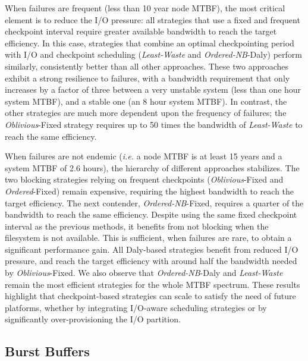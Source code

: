 \documentclass[two]{article}
\newcommand{\ie}[0]{\emph{i.e.}\xspace}
\newcommand{\nocoop}{\emph{Oblivious}\xspace}
\newcommand{\fifoblock}{\emph{Ordered}\xspace}
\newcommand{\fifononblock}{\emph{Ordered-NB}\xspace}
\newcommand{\leastwaste}{\emph{Least-Waste}\xspace}
\def\propfixed{\nocoop-Fixed\xspace}
\def\bfifofixed{\fifoblock-Fixed\xspace}
\def\fifofixed{\fifononblock-Fixed\xspace}
\def\fifodaly{\fifononblock-Daly\xspace}
\def\cooperative{\leastwaste}
\begin{document}
When failures are frequent (less than 10 year node MTBF), the most critical
element is to reduce the I/O pressure: all strategies that use a fixed and
frequent checkpoint interval require greater available bandwidth to reach the
target efficiency.  In this case, strategies that combine an optimal
checkpointing period with I/O and checkpoint scheduling (\cooperative and
\fifodaly) perform similarly, consistently better than all other approaches.
These two approaches exhibit a strong resilience to failures, with a bandwidth
requirement that only increases by a factor of three between a very unstable system
(less than one hour system MTBF), and a stable one (an 8 hour system MTBF). In
contrast, the other strategies are much more dependent upon the frequency of
failures; the \propfixed strategy requires up to 50 times the bandwidth of
\cooperative to reach the same efficiency.

When failures are not endemic (\ie a node MTBF is at least 15 years
and a system MTBF of 2.6 hours), the hierarchy of different
approaches stabilizes. The two blocking strategies relying on
frequent checkpoints (\propfixed and \bfifofixed) remain expensive,
requiring the highest bandwidth to reach the target
efficiency. %
The next contender, \fifofixed, requires a quarter of the  bandwidth
to reach the same efficiency.
Despite using the same fixed checkpoint interval as the previous methods, it
benefits from not blocking when the filesystem is not available.
This is sufficient, when failures are rare, to obtain a significant
performance gain. %
All Daly-based strategies benefit from reduced I/O pressure, and reach the
target efficiency with around half the bandwidth needed by \propfixed. 
We also observe that \fifodaly and \leastwaste remain the most efficient strategies
for the whole MTBF spectrum. These
results highlight that checkpoint-based strategies can scale to
satisfy the need of future platforms, whether by integrating I/O-aware scheduling
strategies or by significantly over-provisioning the I/O partition.

\subsection{Burst Buffers}
\end{document}
